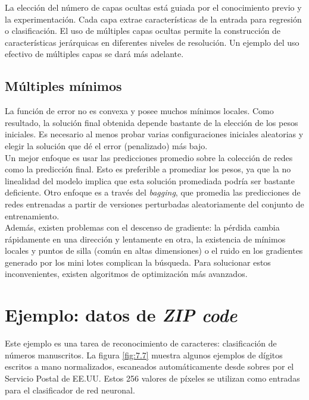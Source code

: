 La elección del número de capas ocultas está guiada por el conocimiento previo y la experimentación. Cada capa extrae características de la entrada para regresión o clasificación. El uso de múltiples capas ocultas permite la construcción de características jerárquicas en diferentes niveles de resolución. Un ejemplo del uso efectivo de múltiples capas se dará más adelante.

\subsection{Múltiples mínimos}

La función de error no es convexa y posee muchos mínimos locales. Como resultado, la solución final obtenida depende bastante de la elección de los pesos iniciales. Es necesario al menos probar varias configuraciones iniciales aleatorias y elegir la solución que dé el error (penalizado) más bajo. \\

Un mejor enfoque es usar las predicciones promedio sobre la colección de redes como la predicción final. Esto es preferible a promediar los pesos, ya que la no linealidad del modelo implica que esta solución promediada podría ser bastante deficiente. Otro enfoque es a través del \textit{bagging}, que promedia las predicciones de redes entrenadas a partir de versiones perturbadas aleatoriamente del conjunto de entrenamiento. \\

Además, existen problemas con el descenso de gradiente: la pérdida cambia rápidamente en una dirección y lentamente en otra, la existencia de mínimos locales y puntos de silla (común en altas dimensiones) o el ruido en los gradientes generado por los mini lotes complican la búsqueda. Para solucionar estos inconvenientes, existen algoritmos de optimización más avanzados.





\section{Ejemplo: datos de \textit{ZIP code}}

Este ejemplo es una tarea de reconocimiento de caracteres: clasificación de números manuscritos. La figura \ref{fig:7.7} muestra algunos ejemplos de dígitos escritos a mano normalizados, escaneados automáticamente desde sobres por el Servicio Postal de EE.UU. Estos 256 valores de píxeles se utilizan como entradas para el clasificador de red neuronal. \\

